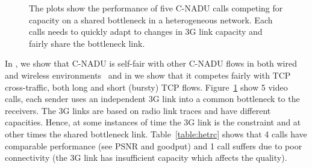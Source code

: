 \begin{figure}[!t]
\centerline{
{}
{}
}
\centerline{
{}
{}
}
\caption{The plots show the performance of five C-NADU calls competing for
capacity on a shared bottleneck in a heterogeneous network. Each calls needs
to quickly adapt to changes in 3G link capacity and fairly share the
bottleneck link.}
\label{fig:hetrc}
\end{figure}

\begin{table}[!t]
\caption{C-NADU: Five calls in a heterogeneous network with end-to-end latency
between \emph{60-120ms} and 0.5\% link-layer losses.}
\label{table:hetrc}
\end{table}

In , we show that C-NADU is self-fair with other C-NADU flows
in both wired and wireless environments~\cite{singh:2010.thesis} and in
 we show that it competes fairly with TCP cross-traffic, both
long and short (bursty) TCP flows. Figure~\ref{fig:hetrc} show 5 video calls,
each sender uses an independent 3G link into a common bottleneck to the
receivers. The 3G links are based on radio link traces and have different
capacities. Hence, at some instances of time the 3G link is the constraint and
at other times the shared bottleneck link. Table~\ref{table:hetrc} shows that
4 calls have comparable performance (see PSNR and goodput) and 1 call suffers
due to poor connectivity (the 3G link has insufficient capacity which affects
the quality).


